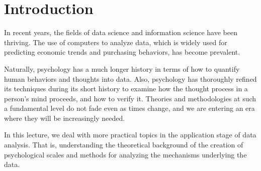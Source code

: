 \section*{Introduction}
In recent years, the fields of data science and information science have been thriving. The use of computers to analyze data, which is widely used for predicting economic trends and purchasing behaviors, has become prevalent.

Naturally, psychology has a much longer history in terms of how to quantify human behaviors and thoughts into data.
Also, psychology has thoroughly refined its techniques during its short history to examine how the thought process in a person's mind proceeds, and how to verify it.
Theories and methodologies at such a fundamental level do not fade even as times change, and we are entering an era where they will be increasingly needed.

In this lecture, we deal with more practical topics in the application stage of data analysis. That is, understanding the theoretical background of the creation of psychological scales and methods for analyzing the mechanisms underlying the data.

